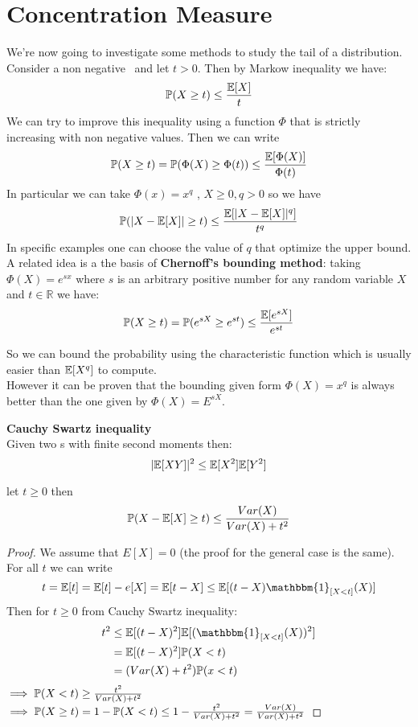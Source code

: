 \chapter{Concentration Measure}
\label{cha:Prop R S}
\vspace{15pt}


We're now going to investigate some methods to study the tail of a distribution.\\
Consider a non negative \rv \  and let $t>0$. Then by Markow inequality we have:
$$\mathbb{P} (X\geq t)\leq \frac{\mathbb{E} [X]}{t}$$
We can try to improve this inequality using a function $\Phi$ that is strictly increasing with non negative values. Then we can write
$$\mathbb{P} (X\geq t)=\mathbb{P} (\Phi(X)\geq \Phi(t) )\leq \frac{ \mathbb{E} [\Phi(X)]}{\Phi(t)}$$
In particular we can take $\Phi(x)=x^q$ , $X\geq 0, q>0$ so we have
$$\mathbb{P} (|X- \mathbb{E} [X]|\geq t)\leq \frac{ \mathbb{E} [|X-\mathbb{E} [X]|^q]}{t^q}$$
In specific examples one can choose the value of $q$ that optimize the upper bound.\\
A related idea is a the basis of \textbf{Chernoff's bounding method}: taking $\Phi(X)=e^{sx}$ where $s$ is an arbitrary positive number for any random variable $X$ and $t\in \mathbb{R}$ we have:
\begin{equation}\label{ineq:Chernoffb}
	\mathbb{P} (X \geq t)= \mathbb{P} (e^{sX}\geq e^{st})\leq \frac{\mathbb{E}[e^{sX}]}{e^{st}}
\end{equation}

So we can bound the probability using the characteristic function which is usually easier than $\mathbb{E} [X^q]$ to compute.\\
However it can be proven that the bounding given form $\Phi (X)=x^q$ is always better than the one given by $\Phi(X)=E^{sX}$.\\
\begin{teo}\textbf{Cauchy Swartz inequality}\\
	Given two \rv s with finite second moments then:
	$$|\mathbb{E}[XY]|^2\leq \mathbb{E}[X^2]\mathbb{E}[Y^2]$$
\end{teo}

\begin{teo}
	let $t\geq 0$ then
	$$\mathbb{P}(X - \mathbb{E}[X]\geq t)\leq \frac{Var(X)}{Var(X)+t^2}$$
\end{teo}
\begin{proof}
	We assume that $E[X]=0$ (the proof for the general case is the same).\\
	For all $t$ we can write 
	$$t=\e[t]=\e[t]-e[X]=\e[t-X]\leq \e[(t-X)\mathbbm{1}_{[X<t]}(X)]$$
	Then for $t\geq 0$ from Cauchy Swartz inequality:
	\[
	\begin{split}
	t^2 
	& \leq \e[(t-X)^2] \e[(\mathbbm{1}_{[X<t]}(X))^2]\\
	&= \e[(t-X)^2] \p(X<t)\\
	&= (Var(X)+t^2)\p(x<t)
	\end{split}	
	\]
	$\implies \mathbb{P}(X<t)\geq \frac{t^2}{Var(X)+t^2}$\\
	$\implies \mathbb{P}(X\geq t)= 1-\mathbb{P}(X<t)\leq 1-\frac{t^2}{Var(X)+t^2}= \frac{Var(X)}{Var(X)+t^2} $
\end{proof}

